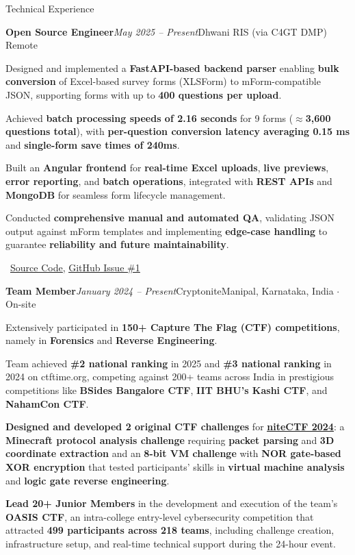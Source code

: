 \documentclass{resume} %
\begin{document}
\begin{rSection}{Technical Experience}

\begin{rSubsection}{\bf Open Source Engineer}{\em May 2025 -- Present}{Dhwani RIS (via C4GT DMP) }{Remote}
\item Designed and implemented a \textbf{FastAPI-based backend parser} enabling \textbf{bulk conversion} of Excel-based survey forms (XLSForm) to mForm-compatible JSON, supporting forms with up to \textbf{400 questions per upload}.
\item Achieved \textbf{batch processing speeds of 2.16 seconds} for 9 forms ($\approx$\textbf{3,600 questions total}), with \textbf{per-question conversion latency averaging 0.15 ms} and \textbf{single-form save times of 240ms}.
\item Built an \textbf{Angular frontend} for \textbf{real-time Excel uploads}, \textbf{live previews}, \textbf{error reporting}, and \textbf{batch operations}, integrated with \textbf{REST APIs} and \textbf{MongoDB} for seamless form lifecycle management.
\item Conducted \textbf{comprehensive manual and automated QA}, validating JSON output against mForm templates and implementing \textbf{edge-case handling} to guarantee \textbf{reliability and future maintainability}.
\item \faGithub~\href{https://github.com/vee1e/bulk-questionnaire-upload}{\underline{Source Code}}, \href{https://github.com/dhwani-ris/bulk-questionnaire-upload/issues/1}{\underline{GitHub Issue \#1}}
\end{rSubsection}

\begin{rSubsection}{\bf Team Member}{\em January 2024 -- Present}{Cryptonite}{Manipal, Karnataka, India $\cdot$ On-site}
\item Extensively participated in \textbf{150+ Capture The Flag (CTF) competitions}, namely in \textbf{Forensics} and \textbf{Reverse Engineering}.
\item Team achieved \textbf{\#2 national ranking} in 2025 and \textbf{\#3 national ranking} in 2024 on ctftime.org, competing against 200+ teams across India in prestigious competitions like \textbf{BSides Bangalore CTF}, \textbf{IIT BHU's Kashi CTF}, and \textbf{NahamCon CTF}.
\item \textbf{Designed and developed 2 original CTF challenges} for \href{https://github.com/Cryptonite-MIT/niteCTF-2024/}{\underline{\textbf{niteCTF 2024}}}: a \textbf{Minecraft protocol analysis challenge} requiring \textbf{packet parsing} and \textbf{3D coordinate extraction} and an \textbf{8-bit VM challenge} with \textbf{NOR gate-based XOR encryption} that tested participants' skills in \textbf{virtual machine analysis} and \textbf{logic gate reverse engineering}.
\item \textbf{Lead 20+ Junior Members} in the development and execution of the team's \textbf{OASIS CTF}, an intra-college entry-level cybersecurity competition that attracted \textbf{499 participants across 218 teams}, including challenge creation, infrastructure setup, and real-time technical support during the 24-hour event.
\end{rSubsection}


\end{rSection}
\end{document}
